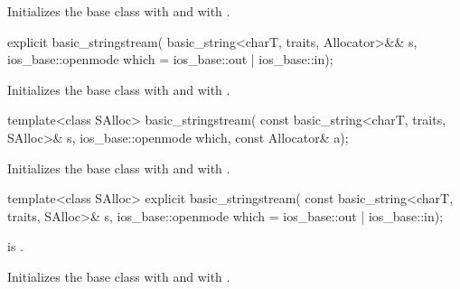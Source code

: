 \begin{itemdescr}
\pnum
\effects
Initializes the base class with
and  with
.
\end{itemdescr}

%
\begin{itemdecl}
explicit basic_stringstream(
  basic_string<charT, traits, Allocator>&& s,
  ios_base::openmode which = ios_base::out | ios_base::in);
\end{itemdecl}

\begin{itemdescr}
\pnum
\effects
Initializes the base class with
and  with
.
\end{itemdescr}

%
\begin{itemdecl}
template<class SAlloc>
  basic_stringstream(
    const basic_string<charT, traits, SAlloc>& s,
    ios_base::openmode which, const Allocator& a);
\end{itemdecl}

\begin{itemdescr}
\pnum
\effects
Initializes the base class with
and  with
.
\end{itemdescr}

%
\begin{itemdecl}
template<class SAlloc>
  explicit basic_stringstream(
    const basic_string<charT, traits, SAlloc>& s,
    ios_base::openmode which = ios_base::out | ios_base::in);
\end{itemdecl}

\begin{itemdescr}
\pnum
\constraints {} is .

\pnum
\effects
Initializes the base class with
and  with
.
\end{itemdescr}


